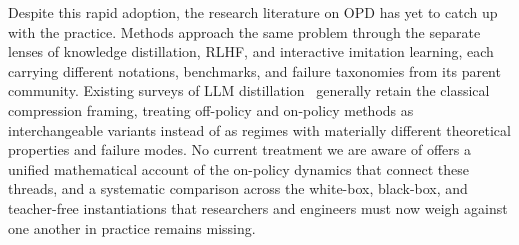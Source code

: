\documentclass{article} %
\begin{document}
Despite this rapid adoption, the research literature on OPD has yet to catch up with the practice. Methods approach the same problem through the separate lenses of knowledge distillation, RLHF, and interactive imitation learning, each carrying different notations, benchmarks, and failure taxonomies from its parent community. Existing surveys of LLM distillation~\citep{2402.13116} generally retain the classical compression framing, treating off-policy and on-policy methods as interchangeable variants instead of as regimes with materially different theoretical properties and failure modes. No current treatment we are aware of offers a unified mathematical account of the on-policy dynamics that connect these threads, and a systematic comparison across the white-box, black-box, and teacher-free instantiations that researchers and engineers must now weigh against one another in practice remains missing.
\end{document}
